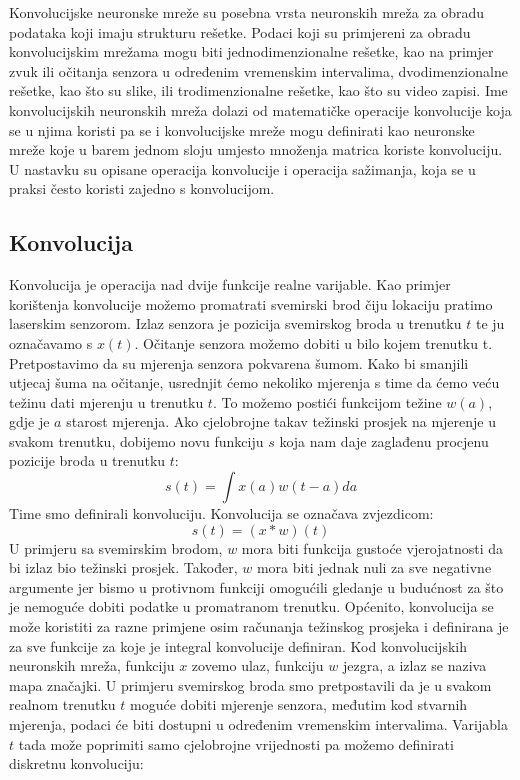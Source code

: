 \nocite{Goodfellow-et-al-2016}

Konvolucijske neuronske mreže su posebna vrsta neuronskih mreža za obradu podataka koji imaju strukturu rešetke. Podaci koji su primjereni za obradu konvolucijskim mrežama mogu biti jednodimenzionalne rešetke, kao na primjer zvuk ili očitanja senzora u određenim vremenskim intervalima, dvodimenzionalne rešetke, kao što su slike, ili trodimenzionalne rešetke, kao što su video zapisi.
Ime konvolucijskih neuronskih mreža dolazi od matematičke operacije konvolucije koja se u njima koristi pa se i konvolucijske mreže mogu definirati kao neuronske mreže koje u barem jednom sloju umjesto množenja matrica koriste konvoluciju. U nastavku su opisane operacija konvolucije i operacija sažimanja, koja se u praksi često koristi zajedno s konvolucijom.

\subsection{Konvolucija}
Konvolucija je operacija nad dvije funkcije realne varijable. Kao primjer korištenja konvolucije možemo promatrati svemirski brod čiju lokaciju pratimo laserskim senzorom. Izlaz senzora je pozicija svemirskog broda u trenutku $t$ te ju označavamo s $x(t)$. Očitanje senzora možemo dobiti u bilo kojem trenutku t.
Pretpostavimo da su mjerenja senzora pokvarena šumom. Kako bi smanjili utjecaj šuma na očitanje, usrednjit ćemo nekoliko mjerenja s time da ćemo veću težinu dati mjerenju u trenutku $t$. To možemo postići funkcijom težine $w(a)$, gdje je $a$ starost mjerenja. Ako cjelobrojne takav težinski prosjek na mjerenje u svakom trenutku, dobijemo novu funkciju $s$ koja nam daje zaglađenu procjenu pozicije broda u trenutku $t$:
\[
s(t) = \int x(a)w(t-a)da
\]
Time smo definirali konvoluciju. Konvolucija se označava zvjezdicom:
\[
s(t) = (x \ast w)(t)
\]
U primjeru sa svemirskim brodom, $w$ mora biti funkcija gustoće vjerojatnosti da bi izlaz bio težinski prosjek. Također, $w$ mora biti jednak nuli za sve negativne argumente jer bismo u protivnom funkciji omogućili gledanje u budućnost za što je nemoguće dobiti podatke u promatranom trenutku. Općenito, konvolucija se može koristiti za razne primjene osim računanja težinskog prosjeka i definirana je za sve funkcije za koje je integral konvolucije definiran.
Kod konvolucijskih neuronskih mreža, funkciju $x$ zovemo ulaz, funkciju $w$ jezgra, a izlaz se naziva mapa značajki.
U primjeru svemirskog broda smo pretpostavili da je u svakom realnom trenutku $t$ moguće dobiti mjerenje senzora, međutim kod stvarnih mjerenja, podaci će biti dostupni u određenim vremenskim intervalima. Varijabla $t$ tada može poprimiti samo cjelobrojne vrijednosti pa možemo definirati diskretnu konvoluciju:
